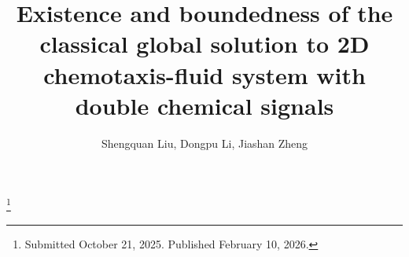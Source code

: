 \documentclass[reqno]{amsart}
\begin{document}
\title[\hfilneg EJDE-2026/10\hfil 
2D chemotaxis-fluid system with double chemical signals]
{Existence and boundedness of the classical global solution to 2D 
chemotaxis-fluid system with double chemical signals}

\author[S. Liu, D. Li, J. Zheng \hfil EJDE-2026/10\hfilneg]
{Shengquan Liu, Dongpu Li, Jiashan Zheng}

\address{Shengquan Liu \newline
School of Mathematics and Statistics,
Liaoning University,
Shenyang 110036,  China}

\address{Dongpu Li \newline
School of Mathematics and Statistics,
Liaoning University,
Shenyang 110036,  China}

\address{Jiashan Zheng (corresponding author) \newline
School of Mathematics and Information Sciences,
Yantai University,
Yantai 264005,  China}

\thanks{Submitted October 21, 2025. Published February 10, 2026.}
\end{document}
